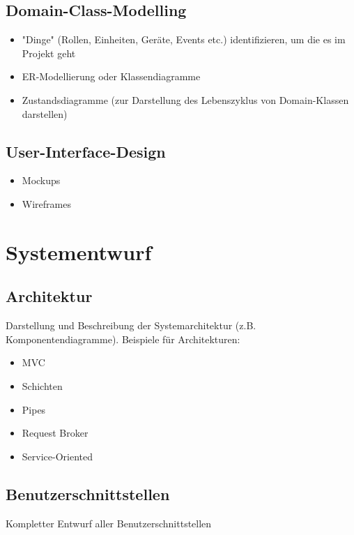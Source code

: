 



\newpage
\section{Domain-Class-Modelling}
\begin{itemize}
	\item "Dinge" (Rollen, Einheiten, Geräte, Events etc.) identifizieren, um die es im Projekt geht
	\item ER-Modellierung oder Klassendiagramme
	\item Zustandsdiagramme (zur Darstellung des Lebenszyklus von Domain-Klassen darstellen)
\end{itemize}

\newpage
\section{User-Interface-Design}
\begin{itemize}
	\item Mockups
	\item Wireframes
\end{itemize}


\chapter{Systementwurf}

\section{Architektur}
Darstellung und Beschreibung der Systemarchitektur (z.B. Komponentendiagramme). 
Beispiele für Architekturen:

\begin{itemize}
	\item MVC
	\item Schichten
	\item Pipes
	\item Request Broker
	\item Service-Oriented
\end{itemize}

\section{Benutzerschnittstellen} 
Kompletter Entwurf aller Benutzerschnittstellen


